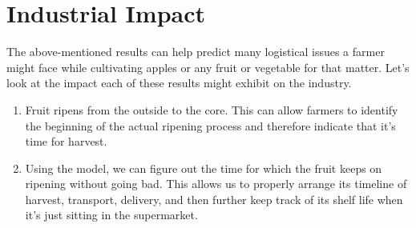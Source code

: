 \documentclass[10pt, a4paper]{article}
\begin{document}
\newpage
\section{Industrial Impact}
The above-mentioned results can help predict many logistical issues a farmer might face while cultivating apples or any fruit or vegetable for that matter. Let's look at the impact each of these results might exhibit on the industry. \\
\begin{enumerate}
    \item Fruit ripens from the outside to the core. This can allow farmers to identify the beginning of the actual ripening process and therefore indicate that it's time for harvest.
    \item Using the model, we can figure out the time for which the fruit keeps on ripening without going bad. This allows us to properly arrange its timeline of harvest, transport, delivery, and then further keep track of its shelf life when it's just sitting in the supermarket.
\end{enumerate}



\end{document}
